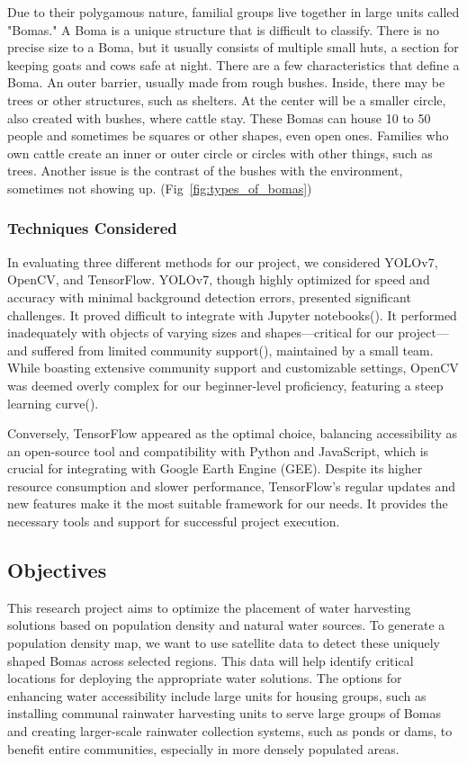 \documentclass[10pt]{article}
\begin{document}
Due to their polygamous nature, familial groups live together in large units called "Bomas." A Boma is a unique structure that is difficult to classify. There is no precise size to a Boma, but it usually consists of multiple small huts, a section for keeping goats and cows safe at night. There are a few characteristics that define a Boma. An outer barrier, usually made from rough bushes. Inside, there may be trees or other structures, such as shelters. At the center will be a smaller circle, also created with bushes, where cattle stay. These Bomas can house 10 to 50 people and sometimes be squares or other shapes, even open ones. Families who own cattle create an inner or outer circle or circles with other things, such as trees. Another issue is the contrast of the bushes with the environment, sometimes not showing up. (Fig~\ref{fig:types_of_bomas})

\subsubsection{Techniques Considered}

In evaluating three different methods for our project, we considered YOLOv7, OpenCV, and TensorFlow. YOLOv7, though highly optimized for speed and accuracy with minimal background detection errors, presented significant challenges. It proved difficult to integrate with Jupyter notebooks(\autocite{s23135849}). It performed inadequately with objects of varying sizes and shapes—critical for our project—and suffered from limited community support(\autocite{IJERTV10IS060287}), maintained by a small team. While boasting extensive community support and customizable settings, OpenCV was deemed overly complex for our beginner-level proficiency, featuring a steep learning curve(\autocite{9174593}).

Conversely, TensorFlow appeared as the optimal choice, balancing accessibility as an open-source tool and compatibility with Python and JavaScript, which is crucial for integrating with Google Earth Engine (GEE).
Despite its higher resource consumption and slower performance, TensorFlow's regular updates and new features make it the most suitable framework for our needs. It provides the necessary tools and support for successful project execution.

\subsection{Objectives}

This research project aims to optimize the placement of water harvesting solutions based on population density and natural water sources. To generate a population density map, we want to use satellite data to detect these uniquely shaped Bomas across selected regions. This data will help identify critical locations for deploying the appropriate water solutions. The options for enhancing water accessibility include large units for housing groups, such as installing communal rainwater harvesting units to serve large groups of Bomas and creating larger-scale rainwater collection systems, such as ponds or dams, to benefit entire communities, especially in more densely populated areas.
\end{document}
